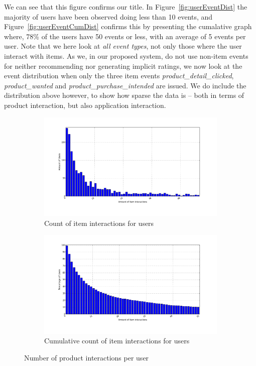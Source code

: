 We can see that this figure confirms our title. In
Figure~\ref{fig:userEventDist} the majority of users have been observed
doing less than 10 events, and Figure~\ref{fig:userEventCumDist} confirms this
by presenting the cumalative graph where, 78\% of the users have 50 events or
less, with an average of 5 events per user. Note that we here look at
\textit{all event types}, not only those where the user interact with items. As
we, in our proposed system, do not use non-item events for neither recommending
nor generating implicit ratings, we now look at the event distribution when
only the three item events \textit{product\_detail\_clicked},
\textit{product\_wanted} and \textit{product\_purchase\_intended} are issued.
We do include the distribution above however, to show how sparse the data is --
both in terms of product interaction, but also application interaction.

\begin{figure}[H]
    \centering
    \begin{subfigure}{.5\textwidth}
        \includegraphics[width=\dualGraphWidth]{image/ratingsPerUserdistribution.png}
        \centering
        \caption{Count of item interactions for users}
        \label{fig:ratingsPerUser}
    \end{subfigure}%
    \begin{subfigure}{.5\textwidth}
        \includegraphics[width=\dualGraphWidth]{image/ratingsPerUsercumdistribution.png}
        \centering
        \caption{Cumulative count of item interactions for users}
        \label{fig:ratingsPerUserCum}
    \end{subfigure}
    \caption{Number of product interactions per user}
\end{figure}

